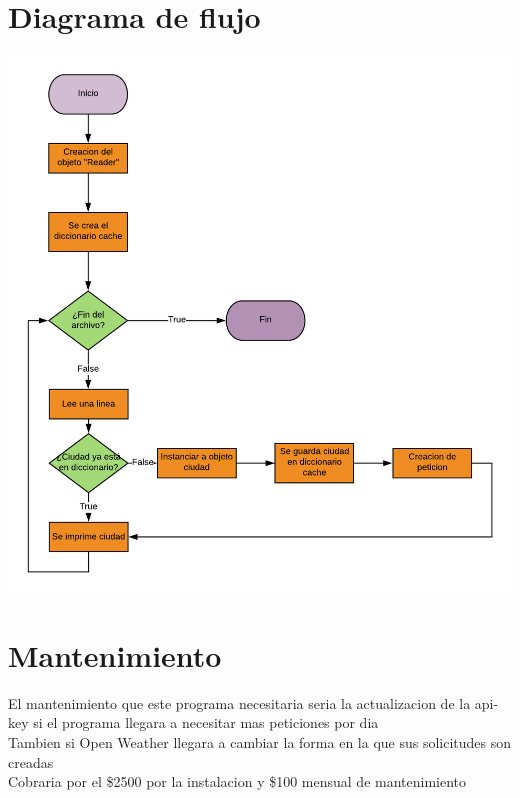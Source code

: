 \documentclass{article}
\begin{document}
\section{Diagrama de flujo}
\includegraphics{Imagen.png}
\section{Mantenimiento}
El mantenimiento que este programa necesitaria seria la actualizacion de la api-key si el programa
llegara a necesitar mas peticiones por dia\\
Tambien si Open Weather llegara a cambiar la forma en la que sus solicitudes son creadas\\
Cobraria por el \$2500 por la instalacion y \$100 mensual de mantenimiento
\end{document}

